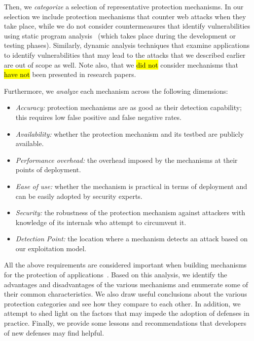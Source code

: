 \documentclass[10pt,journal,compsoc]{IEEEtran}
\newcommand{\hlc}[2][yellow]{ {\sethlcolor{#1} \hl{#2}} }
\begin{document}
Then, we {\it categorize} a selection of representative
protection mechanisms. In our selection we include protection
mechanisms that counter web attacks when they take place,
while we do not consider countermeasures that identify
vulnerabilities using static program analysis~\cite{SZ12}
(which takes place during the development or testing
phases). Similarly, dynamic analysis techniques that examine
applications to identify vulnerabilities that may lead to the attacks
that we described earlier are out of scope as well. Note also, that we
\hlc[yellow]{did not} consider mechanisms that
\hlc[yellow]{have not} been presented in research papers.

Furthermore, we {\it analyze} each mechanism across the
following dimensions:
\vspace{-1.5mm}
\begin{itemize}
\item {\it Accuracy:} protection mechanisms are as good
  as their detection capability; this requires low false positive and
  false negative rates.
\item {\it Availability:} whether the protection mechanism and its
  testbed are publicly available.
\item {\it Performance overhead:} the 
  overhead imposed by the mechanisms at their points of deployment.
\item {\it Ease of use:} whether the
  mechanism is practical in terms of deployment
  and can be easily adopted by security experts.
\item {\it Security:} the robustness of the protection mechanism against
  attackers with knowledge of its internals who attempt to circumvent it.
\item {\it Detection Point:} the location where a mechanism detects an attack
  based on our exploitation model.
\end{itemize}
\vspace{-1.5mm} 
\noindent
All the above requirements are considered important
when building mechanisms for the protection of
applications~\cite{A01,A00,SPWS13,nature2014}.
Based on this analysis, we identify the advantages
and disadvantages of the
various mechanisms and enumerate some of their common
characteristics. We also draw useful conclusions
about the various protection categories and see how they compare
to each other.
In addition, we attempt to shed light on the factors
that may impede the adoption of defenses in practice.
Finally,
we provide some lessons and recommendations that
developers of new defenses may find helpful.
\end{document}

